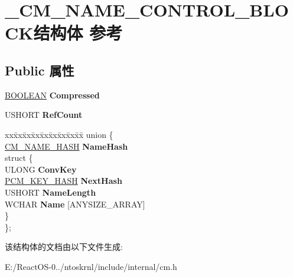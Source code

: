 \hypertarget{struct___c_m___n_a_m_e___c_o_n_t_r_o_l___b_l_o_c_k}{}\section{\+\_\+\+C\+M\+\_\+\+N\+A\+M\+E\+\_\+\+C\+O\+N\+T\+R\+O\+L\+\_\+\+B\+L\+O\+C\+K结构体 参考}
\label{struct___c_m___n_a_m_e___c_o_n_t_r_o_l___b_l_o_c_k}
\subsection*{Public 属性}
\begin{DoxyCompactItemize}
\item 
\mbox{\label{struct___c_m___n_a_m_e___c_o_n_t_r_o_l___b_l_o_c_k_a94e62cc1357f4a2e062f31107e48f38b}} 
\hyperlink{_processor_bind_8h_a112e3146cb38b6ee95e64d85842e380a}{B\+O\+O\+L\+E\+AN} {\bfseries Compressed}
\item 
\mbox{\label{struct___c_m___n_a_m_e___c_o_n_t_r_o_l___b_l_o_c_k_aee31811c60ad074aa670f8fbc607e6d3}} 
U\+S\+H\+O\+RT {\bfseries Ref\+Count}
\item 
\mbox{\label{struct___c_m___n_a_m_e___c_o_n_t_r_o_l___b_l_o_c_k_ae68bdd02cf501a6f9d0acef2603ff569}} 
\begin{tabbing}
xx\=xx\=xx\=xx\=xx\=xx\=xx\=xx\=xx\=\kill
union \{\\
\>\hyperlink{struct___c_m___n_a_m_e___h_a_s_h}{CM\_NAME\_HASH} {\bfseries NameHash}\\
\mbox{\label{union___c_m___n_a_m_e___c_o_n_t_r_o_l___b_l_o_c_k_1_1_0D1399_a6b4413f664e5a8148786f43b04bd401b}} 
\>struct \{\\
\>\>ULONG {\bfseries ConvKey}\\
\>\>\hyperlink{struct___c_m___k_e_y___h_a_s_h}{PCM\_KEY\_HASH} {\bfseries NextHash}\\
\>\>USHORT {\bfseries NameLength}\\
\>\>WCHAR {\bfseries Name} \mbox{[}ANYSIZE\_ARRAY\mbox{]}\\
\>\} \\
\}; \\

\end{tabbing}\end{DoxyCompactItemize}


该结构体的文档由以下文件生成\+:\begin{DoxyCompactItemize}
\item 
E\+:/\+React\+O\+S-\/0../ntoskrnl/include/internal/cm.\+h\end{DoxyCompactItemize}
